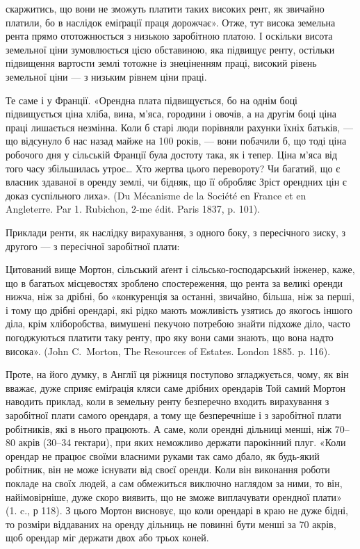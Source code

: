 \parcont{}  %
скаржитись, що вони не зможуть платити таких високих рент, як звичайно
платили, бо в наслідок еміґрації праця дорожчає». Отже, тут висока земельна
рента прямо ототожнюється з низькою заробітною платою. І оскільки висота
земельної ціни зумовлюється цією обставиною, яка підвищує ренту, остільки підвищення
вартости землі тотожне із знеціненням праці, високий рівень земельної
ціни — з низьким рівнем ціни праці.

Те саме і у Франції. «Орендна плата підвищується, бо на однім боці підвищується
ціна хліба, вина, м’яса, городини і овочів, а на другім боці ціна
праці лишається незмінна. Коли б старі люди порівняли рахунки їхніх батьків, —
що відсунуло б нас назад майже на 100 років, — вони побачили б, що тоді ціна
робочого дня у сільській Франції була достоту така, як і тепер. Ціна м’яса від того
часу збільшилась утроє\dots{} Хто жертва цього перевороту? Чи багатий, що є власник
здаваної в оренду землі, чи бідняк, що її обробляє Зріст орендних
цін є доказ суспільного лиха». (Du Mécanisme de la Société en France et en
Angleterre. Par 1. Rubichon, 2-me édit. Paris 1837, p. 101).

Приклади ренти, як наслідку вирахування, з одного боку, з пересічного
зиску, з другого — з пересічної заробітної плати:

Цитований вище Мортон, сільський аґент і сільсько-господарський інженер,
каже, що в багатьох місцевостях зроблено спостереження, що рента
за великі оренди нижча, ніж за дрібні, бо «конкуренція за останні, звичайно,
більша, ніж за перші, і тому що дрібні орендарі, які рідко мають можливість
узятись до якогось іншого діла, крім хліборобства, вимушені пекучою потребою
знайти підхоже діло, часто погоджуються платити таку ренту, про яку вони
сами знають, що вона надто висока». (John C.~Morton, The Resources of Estates.
London 1885. p. 116).

Проте, на його думку, в Англії ця ріжниця поступово згладжується, чому,
як він вважає, дуже сприяє еміґрація кляси саме дрібних орендарів Той самий
Мортон наводить приклад, коли в земельну ренту безперечно входить вирахування
з заробітної плати самого орендаря, а тому ще безперечніше і з заробітної
плати робітників, які в нього працюють. А саме, коли орендні дільниці
менші, ніж 70--80 акрів (30--34 гектари), при яких неможливо держати парокінний
плуг. «Коли орендар не працює своїми власними руками так само
дбало, як будь-який робітник, він не може існувати від своєї оренди. Коли він
виконання роботи покладе на своїх людей, а сам обмежиться виключно наглядом
за ними, то він, найімовірніше, дуже скоро виявить, що не зможе виплачувати
орендної плати» (1. c., р 118). З цього Мортон висновує, що коли орендарі
в краю не дуже бідні, то розміри віддаваних на оренду дільниць не повинні
бути менші за 70 акрів, щоб орендар міг держати двох або трьох коней.


